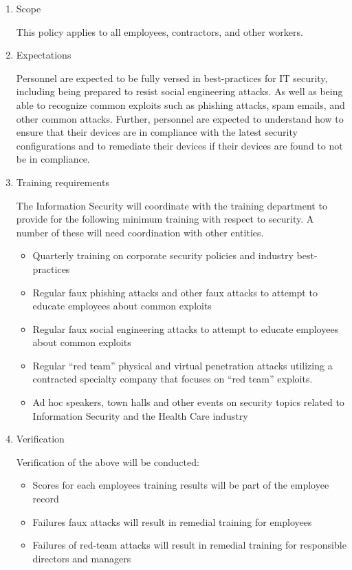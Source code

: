 \documentclass[stu]{apa7}
\begin{document}
\begin{enumerate}
\item Scope
\label{sec:orgc126520}

This policy applies to all employees, contractors, and other workers.

\item Expectations
\label{sec:orgbae4cba}

Personnel are expected to be fully versed in best-practices for IT security, including being prepared to resist social engineering attacks. As well as being able to recognize common exploits such as phishing attacks, spam emails, and other common attacks. Further, personnel are expected to understand how to ensure that their devices are in compliance with the latest security configurations and to remediate their devices if their devices are found to not be in compliance.

\item Training requirements
\label{sec:org6e27189}

The Information Security will coordinate with the training department to provide for the following minimum training with respect to security. A number of these will need coordination with other entities.

\begin{itemize}
\item Quarterly training on corporate security policies and industry best-practices
\item Regular faux phishing attacks and other faux attacks to attempt to educate employees about common exploits
\item Regular faux social engineering attacks to attempt to educate employees about common exploits
\item Regular ``red team'' physical and virtual penetration attacks utilizing a contracted specialty company that focuses on ``red team'' exploits.
\item Ad hoc speakers, town halls and other events on security topics related to Information Security and the Health Care industry
\end{itemize}


\item Verification
\label{sec:orgf68c260}

Verification of the above will be conducted:

\begin{itemize}
\item Scores for each employees training results will be part of the employee record
\item Failures faux attacks will result in remedial training for employees
\item Failures of red-team attacks will result in remedial training for responsible directors and managers
\end{itemize}
\end{enumerate}
\end{document}
